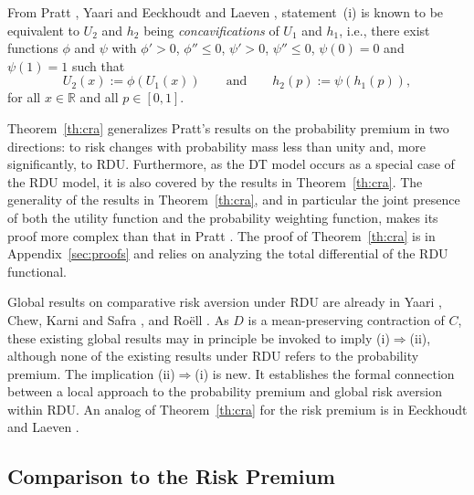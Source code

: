 \documentclass[11pt]{article}
\begin{document}
From Pratt \cite{P64}, Yaari \cite{Y86} and Eeckhoudt and Laeven \cite{EL20}, statement~(i) is known to be equivalent to
$U_{2}$ and $h_{2}$ being \textit{concavifications}
of $U_{1}$ and $h_{1}$, i.e.,
there exist functions $\phi$ and $\psi$ with
$\phi'>0$, $\phi''\leq 0$, $\psi'>0$, $\psi''\leq 0$, $\psi(0)=0$ and $\psi(1)=1$
such that
\begin{equation*}
U_{2}(x):=\phi\left(U_{1}(x)\right)\qquad\mathrm{and}\qquad h_{2}(p):=\psi\left(h_{1}(p)\right),
\end{equation*}
for all $x\in\mathbb{R}$ and all $p\in[0,1]$.

Theorem~\ref{th:cra} generalizes Pratt's results on the probability premium
in two directions:
to risk changes with probability mass less than unity
and, more significantly, to RDU.
Furthermore, as the DT model occurs as a special case of the RDU model,
it is also covered by the results in Theorem~\ref{th:cra}.
The generality of the results in Theorem~\ref{th:cra},
and in particular the joint presence of both the utility function and the probability weighting function,
makes its proof more complex than that in Pratt \cite{P64}.
The proof of Theorem~\ref{th:cra} is in Appendix~\ref{sec:proofs}
and relies on analyzing the total differential of the RDU functional.

Global results on comparative risk aversion under RDU are already in
Yaari \cite{Y86}, Chew, Karni and Safra \cite{CKS87}, and Ro\"ell \cite{R87}.
As $D$ is a mean-preserving contraction of $C$,
these existing global results may in principle be invoked to imply (i)$\Rightarrow$(ii),
although none of the existing results under RDU refers to the probability premium.
The implication (ii)$\Rightarrow$(i) is new.
It establishes the formal connection between a local approach to the probability premium
and global risk aversion within RDU.
An analog of Theorem~\ref{th:cra} for the risk premium is in Eeckhoudt and Laeven \cite{EL20}.

\subsection{Comparison to the Risk Premium}
\end{document}
